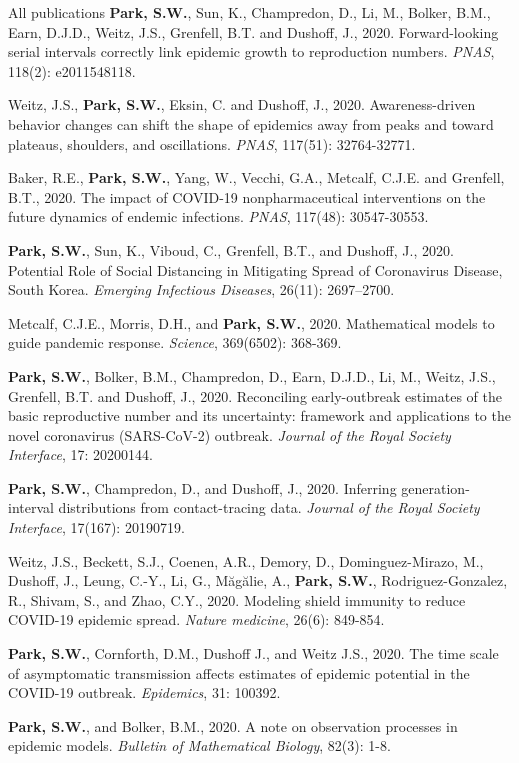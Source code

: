 \documentclass[
	11pt, %
]{resume} %
\begin{document}
\begin{rSection}{All publications}
\textbf{Park, S.W.}, Sun, K., Champredon, D., Li, M., Bolker, B.M., Earn, D.J.D., Weitz, J.S., Grenfell, B.T. and Dushoff, J., 2020. Forward-looking serial intervals correctly link epidemic growth to reproduction numbers. \textit{PNAS}, 118(2): e2011548118.

Weitz, J.S., \textbf{Park, S.W.}, Eksin, C. and Dushoff, J., 2020. Awareness-driven behavior changes can shift the shape of epidemics away from peaks and toward plateaus, shoulders, and oscillations. \textit{PNAS}, 117(51): 32764-32771.

Baker, R.E., \textbf{Park, S.W.}, Yang, W., Vecchi, G.A., Metcalf, C.J.E. and Grenfell, B.T., 2020. The impact of COVID-19 nonpharmaceutical interventions on the future dynamics of endemic infections. \textit{PNAS}, 117(48): 30547-30553.

\textbf{Park, S.W.}, Sun, K., Viboud, C., Grenfell, B.T., and Dushoff, J., 2020. Potential Role of Social Distancing in Mitigating Spread of Coronavirus Disease, South Korea. \textit{Emerging Infectious Diseases}, 26(11): 2697–2700.

Metcalf, C.J.E., Morris, D.H., and \textbf{Park, S.W.}, 2020. Mathematical models to guide pandemic response. \textit{Science}, 369(6502): 368-369.

\textbf{Park, S.W.}, Bolker, B.M., Champredon, D., Earn, D.J.D., Li, M., Weitz, J.S., Grenfell, B.T. and Dushoff, J., 2020. Reconciling early-outbreak estimates of the basic reproductive number and its uncertainty: framework and applications to the novel coronavirus (SARS-CoV-2) outbreak. \textit{Journal of the Royal Society Interface}, 17: 20200144.

\textbf{Park, S.W.}, Champredon, D., and Dushoff, J., 2020. Inferring generation-interval distributions from contact-tracing data. \textit{Journal of the Royal Society Interface}, 17(167): 20190719.

Weitz, J.S., Beckett, S.J., Coenen, A.R., Demory, D., Dominguez-Mirazo, M., Dushoff, J., Leung, C.-Y., Li, G., Măgălie, A., \textbf{Park, S.W.}, Rodriguez-Gonzalez, R., Shivam, S., and Zhao, C.Y., 2020. Modeling shield immunity to reduce COVID-19 epidemic spread. \textit{Nature medicine}, 26(6): 849-854.

\textbf{Park, S.W.}, Cornforth, D.M., Dushoff J., and Weitz J.S., 2020. The time scale of asymptomatic transmission affects estimates of epidemic potential in the COVID-19 outbreak. \textit{Epidemics}, 31: 100392.

\textbf{Park, S.W.}, and Bolker, B.M., 2020. A note on observation processes in epidemic models. \textit{Bulletin of Mathematical Biology}, 82(3): 1-8.


\end{rSection}
\end{document}
